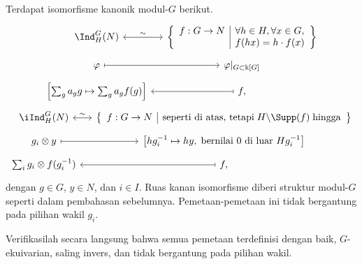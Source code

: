 \begin{lema}\label{prop:Ind-as-mappings}
	Terdapat isomorfisme kanonik modul-$G$ berikut.
	\begin{equation*}\begin{gathered}
		\begin{tikzcd}[column sep=small, row sep=tiny, ampersand replacement=\&]
			\Ind^G_H(N) \arrow[leftrightarrow, r, "\sim"] \& \left\{\begin{array}{r|l}
				f: G \to N & \forall h \in H, \forall x \in G, \\
				& f(hx) = h \cdot f(x)
			\end{array}\right\} \\
			\varphi \arrow[mapsto, r] \& {\varphi|_{G \subset \Bbbk[G]}} \\
			{\left[\sum_g a_g g \mapsto \sum_g a_g f(g)\right]} \& f, \arrow[mapsto, l]
		\end{tikzcd} \\
		\begin{tikzcd}[column sep=small, row sep=tiny, ampersand replacement=\&]
			\iInd^G_H(N) \arrow[leftrightarrow, r, "\sim"] \& \left\{\begin{array}{r|l}
				f: G \to N & \text{seperti di atas, tetapi}\; H \backslash \Supp(f) \;\text{hingga}
			\end{array}\right\} \\
			g_i \otimes y \arrow[mapsto, r] \& {\left[ h g_i^{-1} \mapsto h y, \;\text{bernilai $0$ di luar $Hg_i^{-1}$} \right]} \\
			\sum_i g_i \otimes f(g_i^{-1}) \& f, \arrow[mapsto, l]
		\end{tikzcd}
	\end{gathered}\end{equation*}
	dengan $g\in G$, $y\in N$, dan $i\in I$. Ruas kanan isomorfisme diberi
	struktur modul-$G$ seperti dalam pembahasan sebelumnya. Pemetaan-pemetaan
	ini tidak bergantung pada pilihan wakil $g_i$.
\end{lema}
\begin{bukti}
	Verifikasilah secara langsung bahwa semua pemetaan terdefinisi dengan baik,
	$G$-ekuivarian, saling invers, dan tidak bergantung pada pilihan wakil.
\end{bukti}

